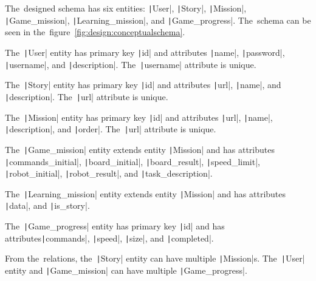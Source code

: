 The~designed schema has six entities: \texttt|User|, \texttt|Story|, \texttt|Mission|, \linebreak\texttt|Game_mission|, \texttt|Learning_mission|, and \texttt|Game_progress|.
The~schema can be seen in the~figure~\ref{fig:design:conceptualschema}.

The~\texttt|User| entity has primary key \texttt|id| and attributes \texttt|name|, \linebreak\texttt|password|, \texttt|username|, and \texttt|description|.
The~\texttt|username| attribute is unique.

The~\texttt|Story| entity has primary key \texttt|id| and attributes \texttt|url|, \texttt|name|, and \texttt|description|.
The~\texttt|url| attribute is unique.

The~\texttt|Mission| entity has primary key \texttt|id| and attributes \texttt|url|, \texttt|name|, \linebreak\texttt|description|, and \texttt|order|.
The~\texttt|url| attribute is unique.

The~\texttt|Game_mission| entity extends entity \texttt|Mission| and has attributes \linebreak\texttt|commands_initial|, \texttt|board_initial|, \texttt|board_result|, \texttt|speed_limit|, \linebreak\texttt|robot_initial|, \texttt|robot_result|, and \texttt|task_description|.

The~\texttt|Learning_mission| entity extends entity \texttt|Mission| and has attributes \texttt|data|, and \texttt|is_story|.

The~\texttt|Game_progress| entity has primary key \texttt|id| and has attributes\linebreak{}\texttt|commands|, \texttt|speed|, \texttt|size|, and \texttt|completed|.

From the~relations, the~\texttt|Story| entity can have multiple \texttt|Mission|s.
The~\texttt|User| entity and \texttt|Game_mission| can have multiple \texttt|Game_progress|.

